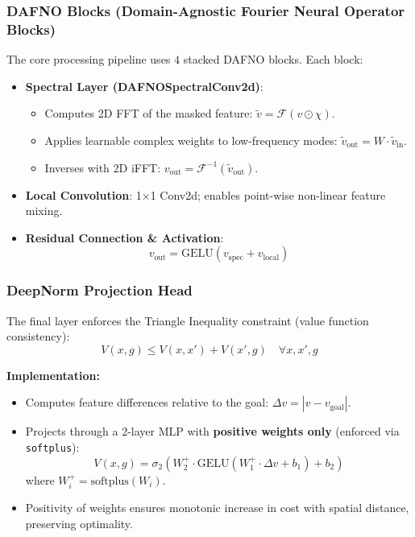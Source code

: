 \documentclass[11pt,a4paper]{article}
\theoremstyle{definition}
\begin{document}
\subsubsection{DAFNO Blocks (Domain-Agnostic Fourier Neural Operator Blocks)}

The core processing pipeline uses $4$ stacked DAFNO blocks. Each block:

\begin{itemize}
  \item \textbf{Spectral Layer (DAFNOSpectralConv2d)}:
    \begin{itemize}
      \item Computes 2D FFT of the masked feature: $\tilde{v} = \mathcal{F}(v \odot \chi)$.
      \item Applies learnable complex weights to low-frequency modes: $\tilde{v}_{\text{out}} = W \cdot \tilde{v}_{\text{in}}$.
      \item Inverses with 2D iFFT: $v_{\text{out}} = \mathcal{F}^{-1}(\tilde{v}_{\text{out}})$.
    \end{itemize}
  \item \textbf{Local Convolution}: 1$\times$1 Conv2d; enables point-wise non-linear feature mixing.
  \item \textbf{Residual Connection \& Activation}: 
    \[
      v_{\text{out}} = \text{GELU}(v_{\text{spec}} + v_{\text{local}})
    \]
\end{itemize}

\subsubsection{DeepNorm Projection Head}

The final layer enforces the Triangle Inequality constraint (value function consistency):
\[
  V(x, g) \leq V(x, x') + V(x', g) \quad \forall x, x', g
\]

\noindent
\textbf{Implementation:}
\begin{itemize}
  \item Computes feature differences relative to the goal: $\Delta v = |v - v_{\text{goal}}|$.
  \item Projects through a 2-layer MLP with \textbf{positive weights only} (enforced via \texttt{softplus}):
    \[
      V(x, g) = \sigma_2(W_2^+ \cdot \text{GELU}(W_1^+ \cdot \Delta v + b_1) + b_2)
    \]
    where $W_i^+ = \text{softplus}(W_i)$.
  \item Positivity of weights ensures monotonic increase in cost with spatial distance, preserving optimality.
\end{itemize}
\end{document}
